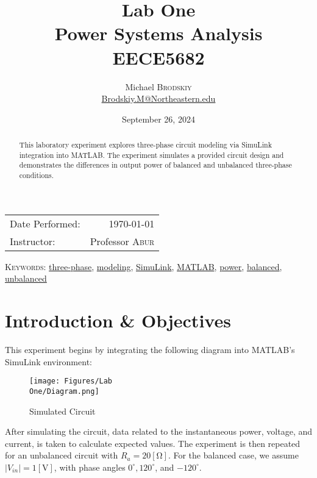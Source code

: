 \documentclass[
	letterpaper, %
	10pt, %
]{CSUniSchoolLabReport}
\title{Lab One\\ Power Systems Analysis \\ EECE5682} %
\author{Michael \textsc{Brodskiy}\\ \small \href{mailto:Brodskiy.M@Northeastern.edu}{Brodskiy.M@Northeastern.edu}}
\date{September 26, 2024} %
\begin{document}
\maketitle %

\begin{center}
	\begin{tabular}{l r}
		Date Performed: & \today \\ %
		Instructor: & Professor \textsc{Abur} \\ %
	\end{tabular}
\end{center}

\newpage

\begin{abstract}

  This laboratory experiment explores three-phase circuit modeling via SimuLink integration into MATLAB. The experiment simulates a provided circuit design and demonstrates the differences in output power of balanced and unbalanced three-phase conditions.

\end{abstract}

\begin{flushleft}

  \textsc{Keywords:} \underline{three-phase}, \underline{modeling}, \underline{SimuLink}, \underline{MATLAB}, \underline{power}, \underline{balanced}, \underline{unbalanced}

\end{flushleft}

\newpage

\section{Introduction \& Objectives}

This experiment begins by integrating the following diagram into MATLAB's SimuLink environment:

\begin{figure}[H]
  \centering
  \texttt{[image: Figures/Lab\\ One/Diagram.png]}
  \caption{Simulated Circuit}
  \label{fig:1}
\end{figure}

After simulating the circuit, data related to the instantaneous power, voltage, and current, is taken to calculate expected values. The experiment is then repeated for an unbalanced circuit with $R_a=20[\si{\ohm}]$. For the balanced case, we assume $|V_{in}|=1[\si{\volt}]$, with phase angles $0^{\circ}, 120^{\circ}$, and $-120^{\circ}$.
\end{document}

